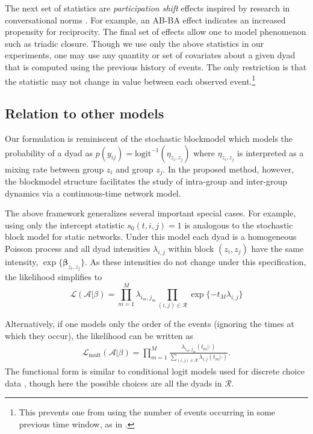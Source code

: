 The next set of statistics are \emph{participation shift} effects inspired by research in conversational norms \cite{Gibson2003}.
For example, an AB-BA effect indicates an increased propensity for reciprocity.
The final set of effects allow one to model phenomenon such as triadic closure.
Though we use only the above statistics in our experiments, one may use any quantity or set of covariates about a given dyad that is computed using the previous history of events.
The only restriction is that the statistic may not change in value between each observed event.\footnote{This prevents one from using the number of events occurring in some previous time window, as in \cite{Gunawardana2011}.}

\subsection{Relation to other models}

Our formulation is reminiscent of the stochastic blockmodel \cite{Nowicki2001,Kemp} which models the probability of a dyad as $p(y_{ij}) =\mbox{logit}^{-1}( \eta_{z_i,z_j})$ where $\eta_{z_i,z_j}$ is interpreted as a mixing rate between group $z_i$ and group $z_j$.
In the proposed method, however, the blockmodel structure facilitates the study of intra-group and inter-group dynamics via a continuous-time network model.

The above framework generalizes several important special cases.
For example,  using only the intercept statistic $s_0(t,i,j) = 1$ is analogous to the stochastic block model for static networks.
Under this model each dyad is a homogeneous Poisson process and all dyad intensities $\lambda_{i,j}$ within block $(z_i,z_j)$ have the same intensity, $\exp\{\boldsymbol{\beta}_{z_i,z_j}\}$.
As these intensities do not change under this specification, the likelihood simplifies to
$$\mathcal{L}(\mathcal{A}|\beta) = \prod_{m=1}^M \lambda_{i_m,j_m} \prod_{(i,j) \in \mathcal{R}} \exp\{-t_M \lambda_{i,j}\}$$

Alternatively, if one models only the order of the events (ignoring the times at which they occur), the likelihood can be written as
\begin{align}
\mathcal{L}_{\mbox{mult}}(\mathcal{A}|\beta) = \prod_{m=1}^M \frac{\lambda_{i_m,j_m}(t_m | \cdot)}{\sum_{(i,j) \in \mathcal{R}} \lambda_{i,j}(t_m | \cdot)}.
\label{eqn:multllk}
\end{align}
The functional form is similar to conditional logit models used for discrete choice data \cite{McFadden1984}, though here the possible choices are all the dyads in $\mathcal{R}$.

